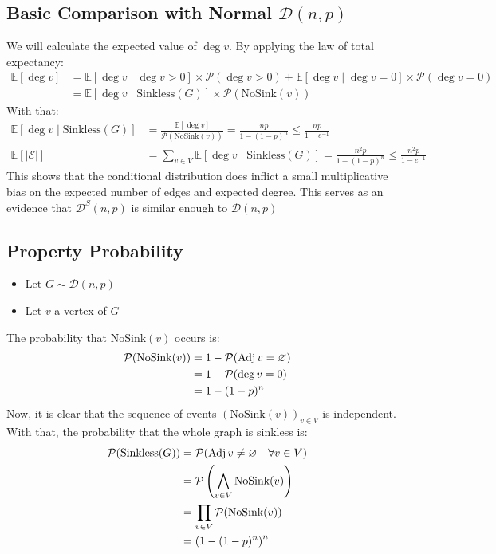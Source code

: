 \subsection{Basic Comparison with Normal $\mathcal{D}(n,p)$}
We will calculate the expected value of $\deg v.$ By applying the law of total expectancy:
\begin{align*}
	\mathbb{E}[\deg v]&= \mathbb{E}[\deg v\mid \deg v > 0]\times \mathscr{P}(\deg v> 0) + \mathbb{E}[\deg v \mid \deg v = 0] \times \mathscr{P}(\deg v=0) \\
	&=  \mathbb{E}[\deg v\mid \text{Sinkless}(G)]\times \mathscr{P}(\text{NoSink}(v))
\end{align*}
With that:
\begin{align*}
	\mathbb{E}[\deg v \mid \text{Sinkless}(G)] &= \frac{\mathbb{E}[\deg v]}{\mathscr{P}(\text{NoSink}(v))}=\frac{np}{1-(1-p)^n} \le \frac{np}{1-e^{-1}} \\
	\mathbb{E}[\lvert \mathcal{E} \rvert] &=\sum_{v\in V} 	\mathbb{E}[\deg v \mid \text{Sinkless}(G)]= \frac{n^2p}{1-(1-p)^n} \le \frac{n^2p}{1-e^{-1}}
\end{align*}
This shows that the conditional distribution does inflict a small multiplicative bias on the expected number of edges and expected degree.
\newline This serves as an evidence that $\mathcal{D}^S(n,p)$ is similar enough to $\mathcal{D}(n,p)$

\subsection{Property Probability}
\begin{itemize}
\item Let $G\sim \mathcal{D}(n,p)$
\item Let $v$ a vertex of $G$
\end{itemize}
The probability that $\text{NoSink}(v)$ occurs is:
\begin{align*}
\mathcal{P}(\text{NoSink}(v))&=1- \mathcal{P}(\operatorname{Adj} v=\varnothing) \\ 
&=1-\mathcal{P}(\deg v=0)  \\
&= 1-(1-p)^n  
\end{align*}
Now, it is clear that the sequence of events $(\text{NoSink}(v))_{v\in V}$ is independent.
\newline With that, the probability that the whole graph is sinkless is:
\begin{align*}
	\mathcal{P}(\text{Sinkless}(G))&=\mathcal{P}(\operatorname{Adj} v\ne \varnothing\quad\forall v \in V)\\
	&=\mathcal{P}\left(\bigwedge_{v\in V} \text{NoSink}(v)\right)\\
	&=\prod_{v\in V}\mathcal{P}(\text{NoSink}(v)) \\
	&=\left(1-(1-p)^n\right)^n
\end{align*}

